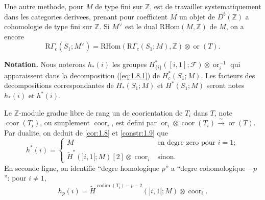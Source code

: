 \documentclass[11pt,a4paper]{article}
\theoremstyle{plain}
\theoremstyle{definition}
\DeclareMathOperator{\codim}{codim}
\newcommand{\coor}{\operatorname{coor}}
\newcommand{\ori}{\operatorname{or}}
\begin{document}
Une autre methode, pour $M$ de type fini sur $\mathbb{Z}$, est de travailler systematiquement dans les categories derivees, prenant pour coefficient $M$ un objet de $D^b(\mathbb{Z})$ a cohomologie de type fini sur $\mathbb{Z}$. Si $M^\vee$ est le dual $\mathrm{RHom}(M,\mathbb{Z})$ de $M$, on a encore
\[\mathrm{R}\Gamma_c(S_1;M^\vee) = \mathrm{RHom}(\mathrm{R}\Gamma_c(S_1;M),\mathbb{Z}) \otimes \ori(T).\]

\textbf{Notation.} Nous noterons $h_*(i)$ les groupes $H^*_{\{i\}}([i,1];\mathcal{F}) \otimes \ori_i^{-1}$ qui apparaissent dans la decomposition (\ref{eq:1.8.1}) de $H^*_c(S_1;M)$. Les facteurs des decompositions correspondantes de $H_*(S_1;M)$ et $H^*(S_1;M)$ seront notes $h_*(i)$ et $h^*(i)$.

Le $\mathbb{Z}$-module gradue libre de rang un de coorientation de $T_i$ dans $T$, note $\coor(T_i)$, ou simplement $\coor_i$, est defini par $\ori_i \otimes \coor(T_i) \xrightarrow{\sim} \ori(T)$. Par dualite, on deduit de \ref{cor:1.8} et \ref{constr:1.9} que
\begin{equation}\label{eq:1.10.1}
h^*(i) = \begin{cases}
M & \text{en degre zero pour } i = 1;\\
\widetilde{H}^*(]i,1[;M)[2] \otimes \coor_i & \text{sinon}.
\end{cases}
\tag{1.10.1}
\end{equation}
En seconde ligne, on identifie ``degre homologique $p$'' a ``degre cohomologique $-p$'': pour $i \neq 1$,
\[h_p(i) = \widetilde{H}^{\codim(T_i)-p-2}(]i,1[;M) \otimes \coor_i.\]
\end{document}
